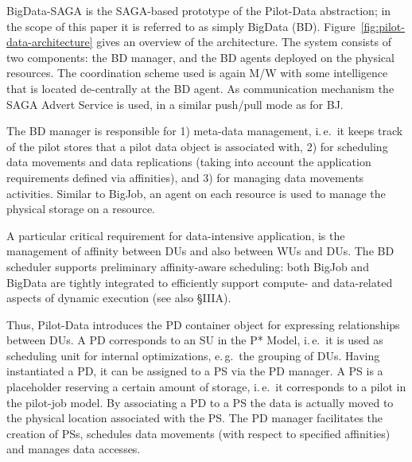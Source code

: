 BigData-SAGA is the SAGA-based prototype of the Pilot-Data
abstraction; in the scope of this paper it is referred to as simply
BigData (BD).  Figure~\ref{fig:pilot-data-architecture} gives an
overview of the architecture.  The system consists of two components:
the BD manager, and the BD agents deployed on the physical
resources. The coordination scheme used is again M/W with some
intelligence that is located de-centrally at the BD agent. As
communication mechanism the SAGA Advert Service is used, in a similar
push/pull mode as for BJ.

The BD manager is responsible for 1) meta-data management, i.\,e.\ it
keeps track of the pilot stores that a pilot data object is associated
with, 2) for scheduling data movements and data replications (taking
into account the application requirements defined via affinities), and
3) for managing data movements activities.  Similar to BigJob, an
agent on each resource is used to manage the physical storage on a
resource.  

A particular critical requirement for data-intensive application, is
the management of affinity between DUs and also between WUs and
DUs. The BD scheduler supports preliminary affinity-aware
scheduling: both BigJob and BigData are tightly integrated to
efficiently support compute- and data-related aspects of dynamic
execution (see also \S{IIIA}).
 
 Thus, Pilot-Data introduces the PD container object
for expressing relationships between DUs. A PD corresponds to an SU in
the P* Model, i.\,e.\ it is used as scheduling unit for internal
optimizations, e.\,g.\ the grouping of DUs. Having instantiated a PD,
it can be assigned to a PS via the PD manager. A PS is a placeholder
reserving a certain amount of storage, i.\,e.\ it corresponds to a
pilot in the pilot-job model. By associating a PD to a PS the data is
actually moved to the physical location associated with the PS. The PD
manager facilitates the creation of PSs, schedules data movements
(with respect to specified affinities) and manages data accesses.




